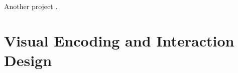 \documentclass{vgtc}                          %
\begin{document}
\medskip

Another project \cite{univie07}. 

































\section{Visual Encoding and Interaction Design} %
\end{document}

